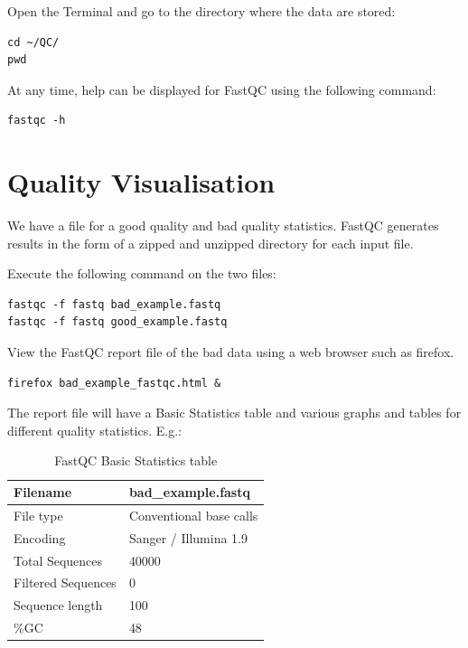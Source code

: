\begin{steps}
Open the Terminal and go to the directory where the data are stored:
\begin{lstlisting}
cd ~/QC/
pwd
\end{lstlisting}

At any time, help can be displayed for FastQC using the following command:
\begin{lstlisting}
fastqc -h
\end{lstlisting}

\end{steps}


\section{Quality Visualisation}

\begin{information}
We have a file for a good quality and bad quality statistics. FastQC generates
results in the form of a zipped and unzipped directory for each input file.
\end{information}

\begin{steps}
Execute the following command on the two files:
\begin{lstlisting}
fastqc -f fastq bad_example.fastq 
fastqc -f fastq good_example.fastq
\end{lstlisting}

View the FastQC report file of the bad data using a web browser such as
firefox.

\begin{lstlisting}
firefox bad_example_fastqc.html &
\end{lstlisting}

\end{steps}

\begin{note}
The report file will have a Basic Statistics table and various graphs and tables
for different quality statistics. E.g.:
\end{note}

\begin{table}[H]
  \centering
  \caption{FastQC Basic Statistics table}
    \begin{tabular}{ll}
    \toprule
    Filename & bad\_example.fastq \\
    \midrule
    File type & Conventional base calls \\
    Encoding & Sanger / Illumina 1.9 \\
    Total Sequences & 40000 \\
    Filtered Sequences & 0 \\
    Sequence length & 100 \\
    \%GC  & 48 \\
    \bottomrule
    \end{tabular}
  \label{tab:badexampleuntrimmed}
\end{table}

